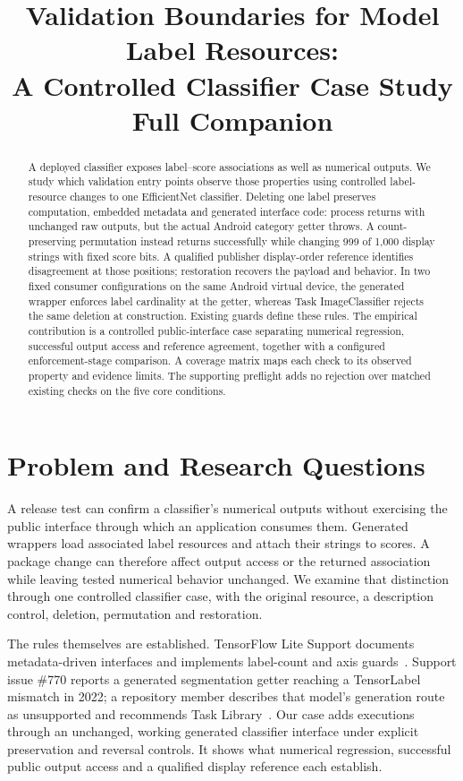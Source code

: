 \documentclass[10pt,conference]{IEEEtran}
\title{Validation Boundaries for Model Label Resources:\\A Controlled Classifier Case Study\\{\large Full Companion}}
\author{\IEEEauthorblockN{Anonymous author(s)}}
\begin{document}
\maketitle

\begin{abstract}
A deployed classifier exposes label--score associations as well as numerical outputs. We study which validation entry points observe those properties using controlled label-resource changes to one EfficientNet classifier. Deleting one label preserves computation, embedded metadata and generated interface code: process returns with unchanged raw outputs, but the actual Android category getter throws. A count-preserving permutation instead returns successfully while changing 999 of 1,000 display strings with fixed score bits. A qualified publisher display-order reference identifies disagreement at those positions; restoration recovers the payload and behavior. In two fixed consumer configurations on the same Android virtual device, the generated wrapper enforces label cardinality at the getter, whereas Task ImageClassifier rejects the same deletion at construction. Existing guards define these rules. The empirical contribution is a controlled public-interface case separating numerical regression, successful output access and reference agreement, together with a configured enforcement-stage comparison. A coverage matrix maps each check to its observed property and evidence limits. The supporting preflight adds no rejection over matched existing checks on the five core conditions.
\end{abstract}

\section{Problem and Research Questions}
A release test can confirm a classifier's numerical outputs without exercising the public interface through which an application consumes them. Generated wrappers load associated label resources and attach their strings to scores. A package change can therefore affect output access or the returned association while leaving tested numerical behavior unchanged. We examine that distinction through one controlled classifier case, with the original resource, a description control, deletion, permutation and restoration.

The rules themselves are established. TensorFlow Lite Support documents metadata-driven interfaces and implements label-count and axis guards~\cite{schema,codegen-doc,tensorlabel}. Support issue \#770 reports a generated segmentation getter reaching a TensorLabel mismatch in 2022; a repository member describes that model's generation route as unsupported and recommends Task Library~\cite{support770,support770reply}. Our case adds executions through an unchanged, working generated classifier interface under explicit preservation and reversal controls. It shows what numerical regression, successful public output access and a qualified display reference each establish.
\end{document}
